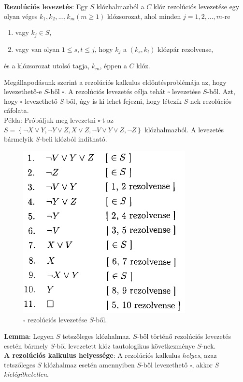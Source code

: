 \documentclass[margin=0px]{article}
\begin{document}
\noindent \textbf{Rezolúciós levezetés}: Egy $S$ klózhalmazból a $C$ klóz rezolúciós levezetése egy olyan véges
$k_{1}, k_{2}, ... ,k_{m} (m \geq 1)$ klózsorozat, ahol minden $j = 1, 2, ..., m$-re

\begin{enumerate}
    \item	vagy $k_{j} \in S$,

    \item	vagy van olyan $1 \leq s,t \le j$, hogy $k_{j}$ a $(k_{s}, k_{t})$ klózpár rezolvense,
\end{enumerate}

\noindent és a klózsorozat utolsó tagja, $k_{m}$, éppen a $C$ klóz.

Megállapodásunk szerint a rezolúciós kalkulus eldöntésproblémája az, hogy levezethető-e $S$-ből $\square$. A
rezolúciós levezetés célja tehát $\square$ levezetése $S$-ből. Azt, hogy $\square$ levezethető $S$-ből,
úgy is ki lehet fejezni, hogy létezik $S$-nek rezolúciós cáfolata.\\

\noindent Példa: Próbáljuk meg levezetni $\square$-t az
$S = \left\{\neg X \vee Y, \neg Y \vee Z, X \vee Z, \neg V \vee Y \vee Z, \neg Z \right\}$
klózhalmazból. A levezetés bármelyik $S$-beli klózból indítható.

\begin{figure}[H]
    \centering
    \includegraphics[width=0.4\linewidth]{img/rezoluciopelda}
    \caption{$\square$ rezolúciós levezetése $S$-ből.}
    \label{fig:rezoluciopelda}
\end{figure}

\noindent \textbf{Lemma}: Legyen $S$ tetszőleges klózhalmaz. $S$-ből történő rezolúciós levezetés esetén bármely $S$-ből
levezetett klóz tautologikus következménye $S$-nek.\\

\noindent \textbf{A rezolúciós kalkulus helyessége}: A rezolúciós kalkulus \textit{helyes}, azaz tetszőleges
$S$ klózhalmaz esetén amennyiben $S$-ből levezethető $\square$, akkor $S$ \textit{kielégíthetetlen}.\\
\end{document}
